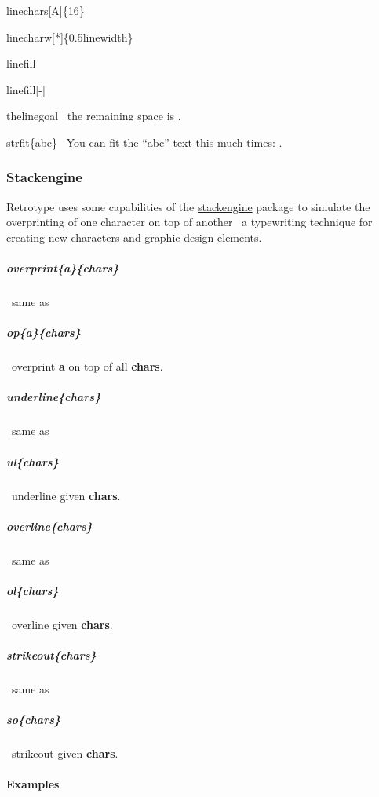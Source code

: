 \documentclass[english,12pt,openany,letterpaper]{book}
\begin{document}
\bs linechars[A]\{16\}


\skipline

\bs linecharw[*]\{0.5\bs linewidth\}


\skipline

\bs linefill

\linefill

\skipline

\bs linefill[-]

\linefill[-]

\skipline

\bs the\bs linegoal \dash\ the remaining space is \the\linegoal.

\skipline

\bs strfit\{abc\} \dash\ You can fit the ``abc'' text this much times: .


\break


\subsubsection{Stackengine}

Retrotype uses some capabilities of the \href{https://www.ctan.org/pkg/stackengine}{stackengine} package to simulate the overprinting of one character on top of another \dash\ a typewriting technique for creating new characters and graphic design elements.

\subparagraph{\bs overprint\{a\}\{chars\}} \dash\ same as

\subparagraph{\tabspace\bs op\{a\}\{chars\}} \dash\ overprint \textbf{a} on top of all \textbf{chars}.

\subparagraph{\bs underline\{chars\}} \dash\ same as

\subparagraph{\tabspace\bs ul\{chars\}} \dash\ underline given \textbf{chars}.

\subparagraph{\bs overline\{chars\}} \dash\ same as

\subparagraph{\tabspace\bs ol\{chars\}} \dash\ overline given \textbf{chars}.

\subparagraph{\bs strikeout\{chars\}} \dash\ same as

\subparagraph{\tabspace\bs so\{chars\}} \dash\ strikeout given \textbf{chars}.

\skipline

\paragraph{Examples}
\end{document}
